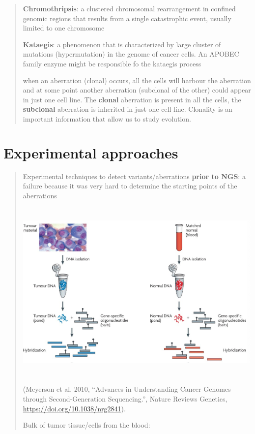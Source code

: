 \begin{quote}
\textbf{Chromothripsis}: a clustered chromosomal rearrangement in
confined genomic regions that results from a single catastrophic event,
usually limited to one chromosome

\textbf{Kataegis}: a phenomenon that is characterized by large cluster
of mutations (hypermutation) in the genome of cancer cells. An APOBEC
family enzyme might be responsible fo the kataegis process


when an aberration (clonal) occurs, all the cells will harbour the
aberration and at some point another aberration (subclonal of the other)
could appear in just one cell line. The \textbf{clonal} aberration is
present in all the cells, the \textbf{subclonal} aberration is inherited
in just one cell line. Clonality is an important information that allow
us to study evolution.
\end{quote}

\hypertarget{experimental-approaches}{%
\section{Experimental approaches}\label{experimental-approaches}}

\begin{quote}
Experimental techniques to detect variants/aberrations \textbf{prior to
NGS}: a failure because it was very hard to determine the starting
points of the aberrations
\includegraphics[width=6.18343in,height=3.84729in]{image9.jpeg}(Meyerson
et al. 2010, ``Advances in Understanding Cancer Genomes through
Second-Generation Sequencing.'', Nature Reviews Genetics,
\url{https://doi.org/10.1038/nrg2841}).

Bulk of tumor tissue/cells from the blood:
\end{quote}

